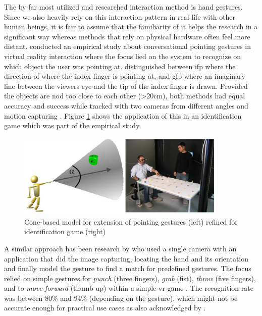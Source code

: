 The by far most utilized and researched interaction method is hand gestures. Since we also heavily rely on this interaction pattern in real life with other human beings, it is fair to assume that the familiarity of it helps the research in a significant way whereas methods that rely on physical hardware often feel more distant. \newline
\cite{Pfeiffer2008} conducted an empirical study about conversational pointing gestures in virtual reality interaction where the focus lied on the system to recognize on which object the user was pointing at. \cite{Pfeiffer2008} distinguished between \gls{ifp} where the direction of where the index finger is pointing at, and \gls{gfp} where an imaginary line between the viewers eye and the tip of the index finger is drawn. Provided the objects are nod too close to each other (>20cm), both methods had equal accuracy and success while tracked with two cameras from different angles and motion capturing \citep{Pfeiffer2008}. Figure \ref{fig:pointinggesture} shows the application of this in an identification game which was part of the empirical study.
\begin{figure}[h]
	\begin{center}
		\includegraphics[width=10cm]{03_Figures/05_LitReview/Pfeiffer2008_Pointing.png}
		\caption[Cone-based model for extension of pointing gestures refined for identification game]{Cone-based model for extension of pointing gestures (left) refined for identification game (right) \citep{Pfeiffer2008}}
		\label{fig:pointinggesture}
	\end{center}
\end{figure}
\newline
A similar approach has been research by \cite{Rautaray2011} who used a single camera with an application that did the image capturing, locating the hand and its orientation and finally model the gesture to find a match for predefined gestures. The focus relied on simple gestures for \textit{punch} (three fingers), \textit{grab} (fist), \textit{throw} (five fingers), and to \textit{move forward} (thumb up) within a simple \gls{vr} game \citep{Rautaray2011}. The recognition rate was between 80\% and 94\% (depending on the gesture), which might not be accurate enough for practical use cases as also acknowledged by \cite{Rautaray2011}. \newline
